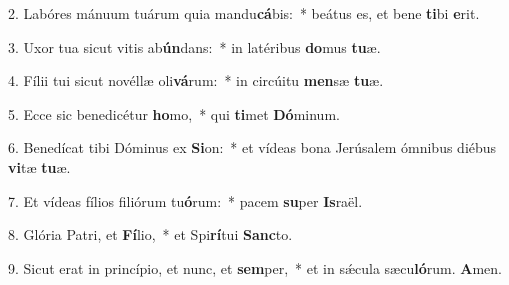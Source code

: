 2. Labóres mánuum tuárum quia mandu\textbf{cá}bis:~*  beátus es, et bene \textbf{ti}bi \textbf{e}rit.\

3. Uxor tua sicut vitis ab\textbf{ún}dans:~*  in latéribus \textbf{do}mus \textbf{tu}æ.\

4. Fílii tui sicut novéllæ oli\textbf{vá}rum:~*  in circúitu \textbf{men}sæ \textbf{tu}æ.\

5. Ecce sic benedicétur \textbf{ho}mo,~*  qui \textbf{ti}met \textbf{Dó}minum.\

6. Benedícat tibi Dóminus ex \textbf{Si}on:~*  et vídeas bona Jerúsalem ómnibus diébus \textbf{vi}tæ \textbf{tu}æ.\

7. Et vídeas fílios filiórum tu\textbf{ó}rum:~*  pacem \textbf{su}per \textbf{Is}raël.\

8. Glória Patri, et \textbf{Fí}lio,~*  et Spi\textbf{rí}tui \textbf{Sanc}to.\

9. Sicut erat in princípio, et nunc, et \textbf{sem}per,~*  et in sǽcula sæcu\textbf{ló}rum. \textbf{A}men.\

